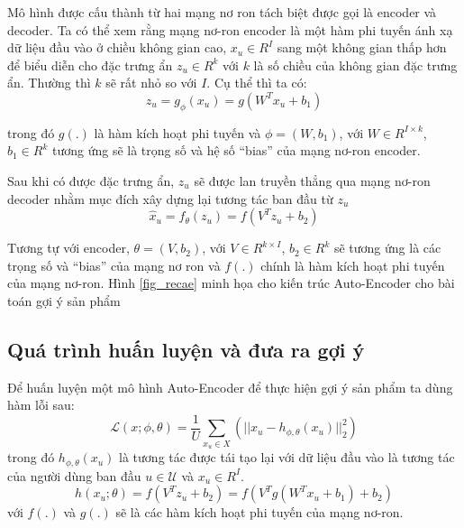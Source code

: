     Mô hình được cấu thành từ hai mạng nơ ron tách biệt được gọi là encoder và decoder. 
    Ta có thể xem rằng mạng nơ-ron encoder là một hàm phi tuyến ánh xạ dữ liệu đầu vào ở chiều không gian cao, $x_u \in R^I$ sang một không gian thấp hơn để biểu diễn cho đặc trưng ẩn $z_u \in R^k$ với $k$ là số chiều của không gian đặc trưng ẩn. 
    Thường thì $k$ sẽ rất nhỏ so với $I$. Cụ thể thì ta có:
    \begin{equation}
        z_u = g_\phi(x_u) = g(W^T x_u + b_1)
    \end{equation}

  
    trong đó $g(.)$ là hàm kích hoạt phi tuyến và $\phi = (W,b_1)$, với $W\in R^{I\times k}$, $b_1 \in R^{k}$ tương ứng sẽ là trọng số và hệ số ``bias'' của mạng nơ-ron encoder. 

    Sau khi có được đặc trưng ẩn, $z_u$ sẽ được lan truyền thẳng qua mạng nơ-ron decoder nhằm mục đích xây dựng lại tương tác ban đầu từ $z_u$
    \begin{equation}
        \widehat{x}_u = f_\theta(z_u) = f(V^T z_u + b_2)
    \end{equation}

    Tương tự với encoder, $\theta = (V,b_2)$, với $V\in R^{k\times I}$, $b_2 \in R^{k}$  sẽ tương ứng là các trọng số và ``bias'' của mạng nơ ron và $f(.)$ chính là hàm kích hoạt phi tuyến của mạng nơ-ron.
    Hình \ref{fig_recae} minh họa cho kiến trúc Auto-Encoder cho bài toán gợi ý sản phẩm

    \subsection{Quá trình huấn luyện và đưa ra gợi ý}
    
    Để huấn luyện một mô hình Auto-Encoder để thực hiện gợi ý sản phẩm ta dùng hàm lỗi sau:
    \begin{equation}
        \label{ae_rec_loss}
        \mathcal{L}(x;\phi,\theta) = \frac {1}{U}\sum_{x_u \in X}(||x_u - h_{\phi,\theta}(x_u)||^2_2)
    \end{equation}
    trong đó $h_{\phi,\theta}(x_u)$ là tương tác được tái tạo lại với dữ liệu đầu vào là tương tác của người dùng ban đầu $u \in \mathcal{U}$ và $x_u \in R^I$.
    \begin{equation}
        h(x_u;\theta) = f(V^T z_u+ b_2) = f(V^T g(W^T x_u + b_1) + b_2)
    \end{equation}    
    với $f(.)$ và $g(.)$ sẽ là các hàm kích hoạt phi tuyến của mạng nơ-ron.
    

